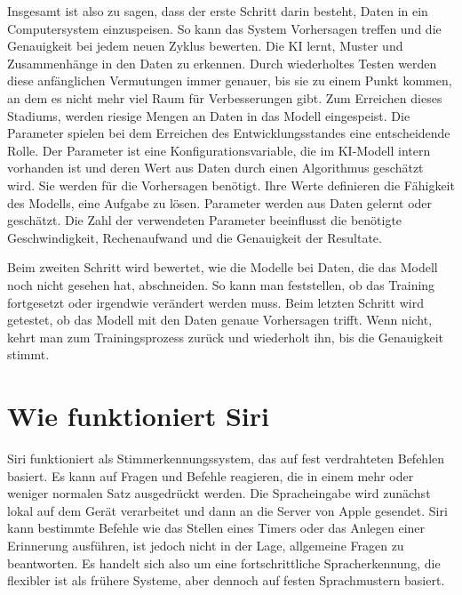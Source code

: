 \documentclass{article}
\begin{document}
Insgesamt ist also zu sagen, dass der erste Schritt darin besteht, Daten in ein Computersystem einzuspeisen. So kann das System Vorhersagen treffen und die Genauigkeit bei jedem neuen Zyklus bewerten. Die KI lernt, Muster und Zusammenhänge in den Daten zu erkennen. Durch wiederholtes Testen werden diese anfänglichen Vermutungen immer genauer, bis sie zu einem Punkt kommen, an dem es nicht mehr viel Raum für Verbesserungen gibt. Zum Erreichen dieses Stadiums, werden riesige Mengen an Daten in das Modell eingespeist. Die Parameter spielen bei dem Erreichen des Entwicklungsstandes eine entscheidende Rolle. Der Parameter ist eine Konfigurationsvariable, die im KI-Modell intern vorhanden ist und deren Wert aus Daten durch einen Algorithmus geschätzt wird. Sie werden für die Vorhersagen benötigt. Ihre Werte definieren die Fähigkeit des Modells, eine Aufgabe zu lösen. Parameter werden aus Daten gelernt oder geschätzt. Die Zahl der verwendeten Parameter beeinflusst die benötigte Geschwindigkeit, Rechenaufwand und die Genauigkeit der Resultate. 


Beim zweiten Schritt wird bewertet, wie die Modelle bei Daten, die das Modell noch nicht gesehen hat, abschneiden. So kann man feststellen, ob das Training fortgesetzt oder irgendwie verändert werden muss. 
Beim letzten Schritt wird getestet, ob das Modell mit den Daten genaue Vorhersagen trifft. Wenn nicht, kehrt man zum Trainingsprozess zurück und wiederholt ihn, bis die Genauigkeit stimmt.


\section{Wie funktioniert Siri}
Siri funktioniert als Stimmerkennungssystem, das auf fest verdrahteten Befehlen basiert. Es kann auf Fragen und Befehle reagieren, die in einem mehr oder weniger normalen Satz ausgedrückt werden. Die Spracheingabe wird zunächst lokal auf dem Gerät verarbeitet und dann an die Server von Apple gesendet. Siri kann bestimmte Befehle wie das Stellen eines Timers oder das Anlegen einer Erinnerung ausführen, ist jedoch nicht in der Lage, allgemeine Fragen zu beantworten. Es handelt sich also um eine fortschrittliche Spracherkennung, die flexibler ist als frühere Systeme, aber dennoch auf festen Sprachmustern basiert.
\end{document}
